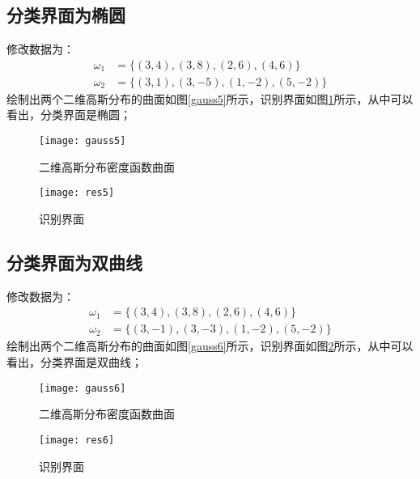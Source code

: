 \documentclass[cn]{elegantbook}
\begin{document}
\subsection{分类界面为椭圆}
修改数据为：
\begin{equation}
\begin{aligned}
\omega_1&=\{(3,4),(3,8),(2,6),(4,6)\} \\
\omega_2&=\{(3,1),(3,-5),(1,-2),(5,-2)\}
\end{aligned}
\end{equation}
绘制出两个二维高斯分布的曲面如图\ref{gauss5}所示，识别界面如图\ref{res5}所示，从中可以看出，分类界面是椭圆；
\begin{figure}[!h]
	\centering
	\begin{minipage}{0.48\linewidth}
		\centering
		\texttt{[image: gauss5]}
		\caption{\label{gauss5}二维高斯分布密度函数曲面}
	\end{minipage}
	\begin{minipage}{0.48\linewidth}
		\centering
		\texttt{[image: res5]}
		\caption{\label{res5}识别界面}
	\end{minipage}
\end{figure}

\subsection{分类界面为双曲线}
修改数据为：
\begin{equation}
\begin{aligned}
\omega_1&=\{(3,4),(3,8),(2,6),(4,6)\} \\
\omega_2&=\{(3,-1),(3,-3),(1,-2),(5,-2)\}
\end{aligned}
\end{equation}
绘制出两个二维高斯分布的曲面如图\ref{gauss6}所示，识别界面如图\ref{res6}所示，从中可以看出，分类界面是双曲线；
\begin{figure}[!h]
	\centering
	\begin{minipage}{0.48\linewidth}
		\centering
		\texttt{[image: gauss6]}
		\caption{\label{gauss6}二维高斯分布密度函数曲面}
	\end{minipage}
	\begin{minipage}{0.48\linewidth}
		\centering
		\texttt{[image: res6]}
		\caption{\label{res6}识别界面}
	\end{minipage}
\end{figure}
\end{document}
